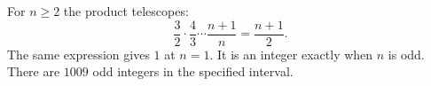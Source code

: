 For $n\ge2$ the product telescopes:
\[
\dfrac{3}{2}\cdot\dfrac{4}{3}\cdots\dfrac{n+1}{n}=\dfrac{n+1}{2}.
\]
The same expression gives $1$ at $n=1$. It is an integer exactly when $n$ is odd. There are $\boxed{1009}$ odd integers in the specified interval.
